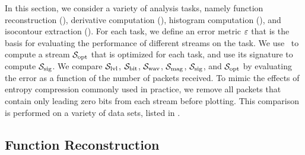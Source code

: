 In this section, we consider a variety of  
analysis tasks, namely function reconstruction (),
derivative computation (), histogram
computation (), and isocontour extraction
(). For each task, we define an error metric $\err$ that
is the basis for evaluating the performance of different streams on the task.
We use~ to compute a stream $\sopt$ that is optimized for each
task, and use its signature to compute $\ssig$.  We compare $\slvl$, $\sbit$,
$\swav$, $\smag$, $\ssig$, and $\sopt$ by evaluating the error as a function of
the number of packets received. To mimic the effects of entropy compression
commonly used in practice, we remove all packets that contain only leading zero
bits from each stream before plotting. This comparison is performed on a
variety of data sets, listed in . 

\subsection{Function Reconstruction}\label{sec:rmse-optimized}

